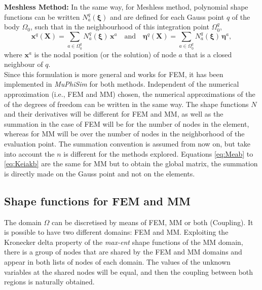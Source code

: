 \documentclass[oneside,11pt,times]{book}
\begin{document}
\textbf{Meshless Method:} In the same way, for Meshless method, polynomial shape functions can be written $N^{q}_a(\bm{\xi})$ and are defined for each Gauss point $q$ of the body $\Omega_0$, such that in the neighbourhood of this integration point $\Omega_{0}^{q}$,
%
\begin{equation} \label{equationElementApproximationMM}
 \bm{x}^{q}(\bm{X}) = \sum_{a \in \Omega_{0}^{q}}  N^ {q}_a(\bm{\xi}) \, \bm{x}^a \quad \textrm{and} \quad
 \bm{\eta}^{q}(\bm{X}) = \sum_{a \in \Omega_{0}^{q}} N^ {q}_a(\bm{\xi}) \, \bm{\eta}^a ,
\end{equation}
%
where $\bm{x}^a$ is the nodal position (or the solution) of node $a$ that is a closed neighbour of $q$.\\

Since this formulation is more general and works for FEM, it has been implemented in \textit{MuPhiSim} for both methods. Independent of the numerical approximation (i.e., FEM and MM) chosen, the numerical approximations of the of the degrees of freedom can be written in the same way. The shape functions $N$ and their derivatives will be different for FEM and MM, as well as the summation in the case of FEM will be for the number of nodes in the element, whereas for MM will be over the number of nodes in the neighborhood of the evaluation point. The summation convention is assumed from now on, but take into account the $n$ is different for the methods explored. Equations \ref{eq:Meab} to \ref{eq:Keiakb} are the same for MM but to obtain the global matrix, the summation is directly made on the Gauss point and not on the elements.\\

\subsection[Shape functions]{Shape functions for FEM and MM}
The domain $\Omega$ can be discretised by means of FEM, MM or both (Coupling). It is possible to have two different domains: FEM and MM. Exploiting the Kronecker delta property of the \textit{max-ent} shape functions of the MM domain, there is a group of nodes that are shared by the FEM and MM domains and appear in both lists of nodes of each domain. The values of the unknown variables at the shared nodes will be equal, and then the coupling between both regions is naturally obtained.
\end{document}
